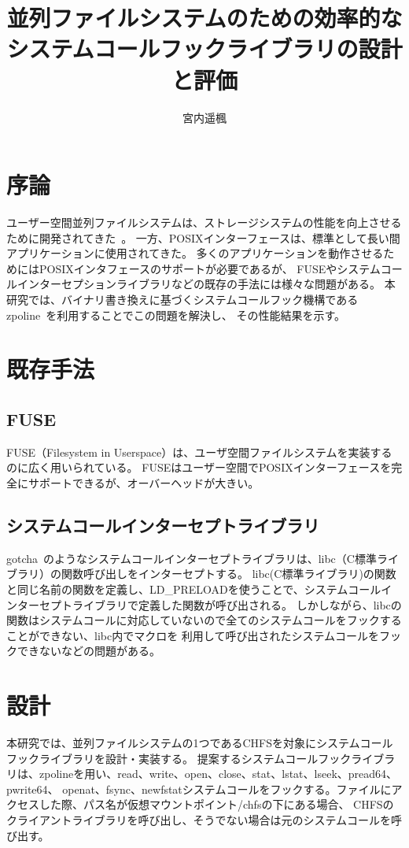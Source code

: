 \documentclass[a4paper,10pt]{jarticle}
\title{並列ファイルシステムのための効率的なシステムコールフックライブラリの設計と評価}
\author{宮内遥楓}
\begin{document}
\maketitle

\section{序論}

ユーザー空間並列ファイルシステムは、ストレージシステムの性能を向上させるために開発されてきた~\cite{tatebe2022chfs, 8514892, 10177390}。 
一方、POSIXインターフェースは、標準として長い間アプリケーションに使用されてきた。 
多くのアプリケーションを動作させるためにはPOSIXインタフェースのサポートが必要であるが、
FUSEやシステムコールインターセプションライブラリなどの既存の手法には様々な問題がある。
本研究では、バイナリ書き換えに基づくシステムコールフック機構であるzpoline~\cite{288689}を利用することでこの問題を解決し、
その性能結果を示す。

\section{既存手法}

\subsection{FUSE}
FUSE（Filesystem in Userspace）は、ユーザ空間ファイルシステムを実装するのに広く用いられている。 
FUSEはユーザー空間でPOSIXインターフェースを完全にサポートできるが、オーバーヘッドが大きい。


\subsection{システムコールインターセプトライブラリ}
gotcha~\cite{gotcha}のようなシステムコールインターセプトライブラリは、libc（C標準ライブラリ）の関数呼び出しをインターセプトする。
libc(C標準ライブラリ)の関数と同じ名前の関数を定義し、LD\_PRELOADを使うことで、システムコールインターセプトライブラリで定義した関数が呼び出される。
しかしながら、libcの関数はシステムコールに対応していないので全てのシステムコールをフックすることができない、libc内でマクロを
利用して呼び出されたシステムコールをフックできないなどの問題がある。


\section{設計}
本研究では、並列ファイルシステムの1つであるCHFSを対象にシステムコールフックライブラリを設計・実装する。
提案するシステムコールフックライブラリは、zpolineを用い、read、write、open、close、stat、lstat、lseek、pread64、pwrite64、
openat、fsync、newfstatシステムコールをフックする。ファイルにアクセスした際、パス名が仮想マウントポイント/chfsの下にある場合、
CHFSのクライアントライブラリを呼び出し、そうでない場合は元のシステムコールを呼び出す。
\end{document}
